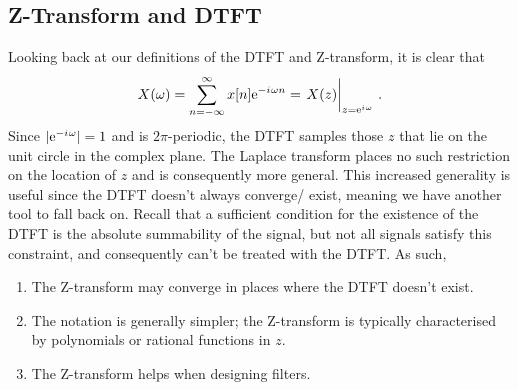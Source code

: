 \subsection{Z-Transform and DTFT}
%
Looking back at our definitions of the DTFT and Z-transform, it is
clear that
%
\begin{displaymath}
  X(\omega) = \infsum{n}x[n]\ex{-\im\omega n} = \left.\vphantom{\frac{1}{1}}X(z)\right|_{z=\ex{\im\omega}} \,.
\end{displaymath}
%
Since $|\mathrm{e}^{-{i\mkern1mu}\omega}| = 1$ and is $2\pi$-periodic, the DTFT
samples those $z$ that lie on the unit circle in the complex plane.
The Laplace transform places no such restriction on the location of
$z$ and is consequently more general. This increased generality is useful
since the DTFT doesn't always converge/ exist, meaning we have another
tool to fall back on. Recall that a sufficient condition for
the existence of the DTFT is the absolute summability of the signal, but
not all signals satisfy this constraint, and consequently can't be
treated with the DTFT. As such,
%
\begin{enumerate}
\item The Z-transform may converge in places where the DTFT doesn't exist.
\item The notation is generally simpler; the Z-transform is typically
  characterised by polynomials or rational functions in $z$.
\item The Z-transform helps when designing filters.
\end{enumerate}

